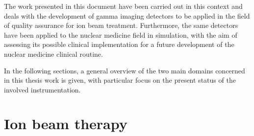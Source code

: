 The work presented in this document have been carried out in this context and deals with the development of gamma imaging detectors to be applied in the field of quality assurance for ion beam treatment. Furthermore, the same detectors have been applied to the nuclear medicine field in simulation, with the aim of assessing its possible clinical implementation for a future development of the nuclear medicine clinical routine. 

In the following sections, a general overview of the two main domains concerned in this thesis work is given, with particular focus on the present status of the involved instrumentation.       
  

\section{Ion beam therapy}

